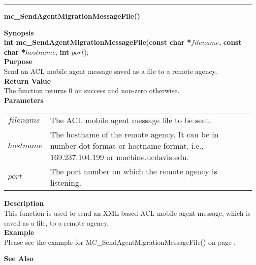 \noindent
\vspace{5pt}
\rule{6.5in}{.01in}
\noindent
{\LARGE \bf mc\_SendAgentMigrationMessageFile()}\\
{}

\noindent
{\bf Synopsis}\\
{\bf int mc\_SendAgentMigrationMessageFile}({\bf const char *}$filename$, {\bf const char *}$hostname$, {\bf int} $port$);\\

\noindent
{\bf Purpose}\\
Send an ACL mobile agent message saved as a file to a remote agency.\\

\noindent
{\bf Return Value}\\
The function returns 0 on success and non-zero otherwise.\\

\noindent
{\bf Parameters}
\vspace{-0.1in}
\begin{description}
\item
\begin{tabular}{p{20 mm}p{135 mm}}
$filename$ & The ACL mobile agent message file to be sent.\\
$hostname$ & The hostname of the remote agency. It can be in number-dot 
format or hostname format, i.e., 169.237.104.199 or machine.ucdavis.edu.\\
$port$ & The port number on which the remote agency is listening. 
\end{tabular}
\end{description}

\noindent
{\bf Description}\\
This function is used to send an XML based ACL mobile agent message, which 
is saved as a file, to a remote agency.\\ 

\noindent
{\bf Example}\\
Please see the example for MC\_SendAgentMigrationMessageFile() on page
\pageref{api:MC_SendAgentMigrationMessageFile()}.
\noindent

\noindent
{\bf See Also}\\

